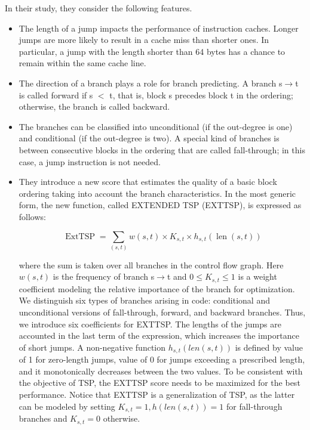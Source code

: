 In their study, they consider the following features.

\begin{itemize}
\item The length of a jump impacts the performance of instruction caches. Longer jumps are more likely to result
in a cache miss than shorter ones. In particular, a jump
with the length shorter than 64 bytes has a chance to
remain within the same cache line.

\item The direction of a branch plays a role for branch predicting. A branch s$\rightarrow$t is called forward if s $<$ t, that is,
block s precedes block t in the ordering; otherwise, the
branch is called backward.

\item The branches can be classified into unconditional (if the
out-degree is one) and conditional (if the out-degree is
two). A special kind of branches is between consecutive
blocks in the ordering that are called fall-through; in this
case, a jump instruction is not needed.

\item They introduce a new score that estimates the quality
of a basic block ordering taking into account the branch
characteristics. In the most generic form, the new function,
called EXTENDED TSP (EXTTSP), is expressed as follows:

$$\operatorname{ExtTSP}=\sum_{(s, t)} w(s, t) \times K_{s, t} \times h_{s, t}(\operatorname{len}(s, t))$$


where the sum is taken over all branches in the control
flow graph. Here $w(s, t)$ is the frequency of branch s$\rightarrow$t and
$0 \leq K_{s,t} \leq 1$ is a weight coefficient modeling the relative
importance of the branch for optimization. We distinguish
six types of branches arising in code: conditional and unconditional versions of fall-through, forward, and backward
branches. Thus, we introduce six coefficients for EXTTSP.
The lengths of the jumps are accounted in the last term of the
expression, which increases the importance of short jumps.
A non-negative function $h_{s,t}(len(s, t))$ is defined by value
of 1 for zero-length jumps, value of 0 for jumps exceeding a
prescribed length, and it monotonically decreases between
the two values. To be consistent with the objective of TSP,
the EXTTSP score needs to be maximized for the best performance. Notice that EXTTSP is a generalization of TSP, as the
latter can be modeled by setting $K_{s,t} = 1, h(len(s, t)) = 1$
for fall-through branches and $K_{s,t} = 0$ otherwise.


\end{itemize}


